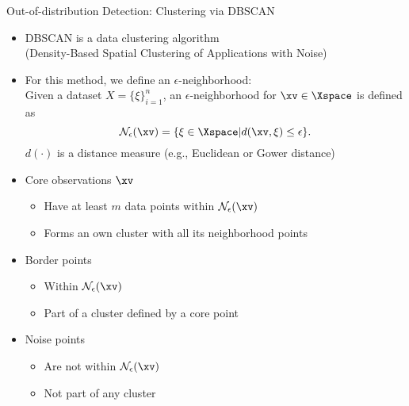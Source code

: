 \documentclass[11pt,compress,t,notes=noshow, aspectratio=169, xcolor=table]{beamer}
\begin{document}
\begin{frame}[c]{Out-of-distribution Detection: Clustering via DBSCAN}
\begin{itemize}
	\item DBSCAN is a data clustering algorithm \\ (Density-Based Spatial Clustering of Applications with Noise) 
	\pause
	\item For this method, we define an $\epsilon$-neighborhood: \\
	Given a dataset $X = \{\xi\}_{i = 1}^n$, an $\epsilon$-neighborhood for $\xv \in \Xspace$ is defined as 
	$$ \mathcal{N}_{\epsilon}(\xv) = \{\xi \in \Xspace | d(\xv, \xi) \le \epsilon\}.$$
	 $d(\cdot)$ is a distance measure (e.g., Euclidean or Gower distance) 
	 \pause
	\item Core observations $\xv$
	\begin{itemize}
	    \item Have at least $m$ data points within $\mathcal{N}_{\epsilon}(\xv)$
	    \item Forms an own cluster with all its neighborhood points
	\end{itemize}
	\pause
    \item Border points
    \begin{itemize}
        \item Within $\mathcal{N}_{\epsilon}(\xv)$
        \item Part of a cluster defined by a core point
    \end{itemize}
    \pause
    \item Noise points
    \begin{itemize}
        \item Are not within $\mathcal{N}_{\epsilon}(\xv)$
        \item Not part of any cluster
    \end{itemize}
\end{itemize}
\end{frame}
\end{document}
